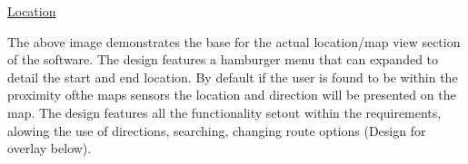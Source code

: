 \underline{Location}
\begin{center}
\end{center}
 The above image demonstrates the base for the actual location/map view section of the software. The design features a hamburger menu that can expanded to detail the start and end location. By default if the user is found to be within the proximity ofthe maps sensors the location and direction will be presented on the map. The design features all the functionality setout within the requirements, alowing the use of directions, searching, changing route options (Design for overlay below). 

